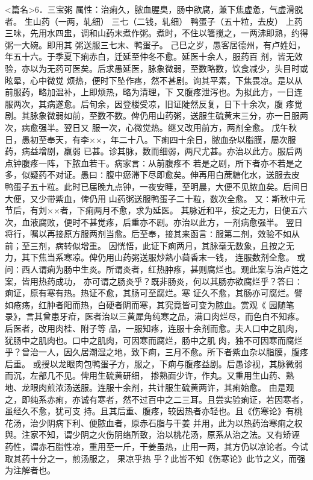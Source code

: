 \documentclass[a4paper,12pt,UTF8,twoside]{ctexbook}
\begin{document}
<篇名>6．三宝粥
属性：治痢久，脓血腥臭，肠中欲腐，兼下焦虚惫，气虚滑脱者。 
生山药（一两，轧细） 三七（二钱，轧细） 鸭蛋子（五十粒，去皮） 
上药三味，先用水四盅，调和山药末煮作粥。煮时，不住以箸搅之，一两沸即熟，约得粥一大碗。即用其 
粥送服三七末、鸭蛋子。 
己巳之岁，愚客居德州，有卢姓妇，年五十六。于季夏下痢赤白，迁延至仲冬不愈。延医十余人，服药百 
剂，皆无效验，亦以为无药可医矣。后求愚延医，脉象微弱，至数略数，饮食减少，头目时或眩晕，心中微觉 
烦热，便时下坠作疼，然不甚剧。询其平素，下焦畏凉。是以从前服药，略加温补，上即烦热，略为清理，下 
又腹疼泄泻也。为拟此方，一日连服两次，其病遂愈。后旬余，因登楼受凉，旧证陡然反复，日下十余次，腹 
疼觉剧。其脉象微弱如前，至数不数。俾仍用山药粥，送服生硫黄末三分，亦一日服两次，病愈强半。翌日又 
服一次，心微觉热。继又改用前方，两剂全愈。 
戊午秋日，愚初至奉天，有李××，年二十八。下痢四十余日，脓血杂以脂膜，屡次服药，病益增剧，羸弱 
已甚。诊其脉，数而细弱，两尺尤甚。亦治以此方。服后两点钟腹疼一阵，下脓血若干。病家言∶从前腹疼不 
若是之剧，所下者亦不若是之多，似疑药不对证。愚曰∶腹中瘀滞下尽即愈矣。伸再用白蔗糖化水，送服去皮 
鸭蛋子五十粒。此时已届晚九点钟，一夜安睡，至明晨，大便不见脓血矣。后间日大便，又少带紫血，俾仍用 
山药粥送服鸭蛋子二十粒，数次全愈。 
又∶斯秋中元节后，有刘××者，下痢两月不愈，求为延医。 
其脉近和平，按之无力，日便五六次，血液腐败，便时不甚觉疼，后重亦不剧。亦治以此方，一剂病愈强半。 
翌日将行，嘱以再接原方服两剂当愈。后至奉，接其来函言∶服第二剂，效验不如从前；至三剂，病转似增重。 
因恍悟，此证下痢两月，其脉毫无数象，且按之无力，其下焦当系寒凉。俾仍用山药粥送服炒熟小茴香末一钱， 
连服数剂全愈。 
或问∶西人谓痢为肠中生炎。所谓炎者，红热肿疼，甚则腐烂也。观此案与治卢姓之案，皆用热药成功， 
亦可谓之肠炎乎？既非肠炎，何以其肠亦欲腐烂乎？答曰∶痢证，原有寒有热。热证不愈，其肠可至腐烂。寒 
证久不愈，其肠亦可腐烂。譬如疮疡，红肿者阳而热，白硬者阴而寒，其究竟皆可变为脓血。赏观《 园随笔 
录》，言其曾患牙疳，医者治以三黄犀角纯寒之品，满口肉烂尽，而色白不知疼。后医者，改用肉桂、附子等 
品，一服知疼，连服十余剂而愈。夫人口中之肌肉，犹肠中之肌肉也。口中之肌肉，可因寒而腐烂，肠中之肌 
肉，独不可因寒而腐烂乎？曾治一人，因久居潮湿之地，致下痢，三月不愈。所下者紫血杂以脂膜，腹疼后重。 
或授以龙眼肉包鸭蛋子方，服之，下痢与腹疼益剧。后愚诊视，其脉微弱而沉，左部几不见。俾用生硫黄研细， 
掺熟面少许，作丸。又重用生山药、熟地、龙眼肉煎浓汤送服。连服十余剂，共计服生硫黄两许，其痢始愈。 
由是观之，即纯系赤痢，亦诚有寒者，然不过百中之二三耳。且尝实验痢证，若因寒者，虽经久不愈，犹可支 
持。且其后重、腹疼，较因热者亦轻也。且《伤寒论》有桃花汤，治少阴病下利、便脓血者，原赤石脂与干姜 
并用，此为以热药治寒痢之权舆。注家不知，谓少阴之火伤阴络所致，治以桃花汤，原系从治之法。又有矫诬 
药性，谓赤石脂性凉，重用至一斤，干姜虽热，止用一两，其方仍以凉论者。今试取其药十分之一，煎汤服之， 
果凉乎热 
乎？此皆不知《伤寒论》此节之义，而强为注解者也。 
\end{document}
